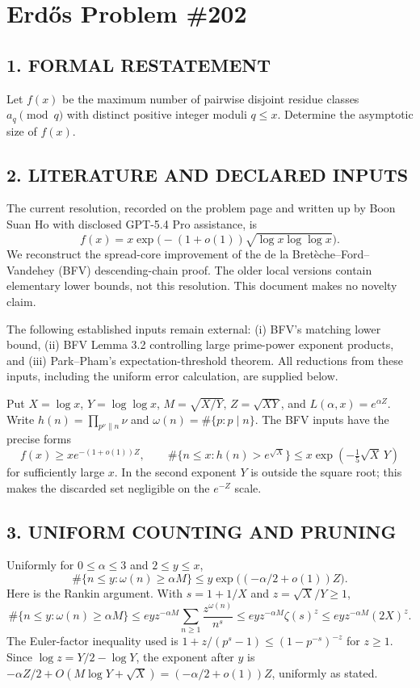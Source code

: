 \section{Erd\H{o}s Problem \#202}
\subsection*{1. FORMAL RESTATEMENT}
Let $f(x)$ be the maximum number of pairwise disjoint residue classes $a_q\pmod q$ with distinct positive integer moduli $q\le x$. Determine the asymptotic size of $f(x)$.
\subsection*{2. LITERATURE AND DECLARED INPUTS}
The current resolution, recorded on the problem page and written up by Boon Suan Ho with disclosed GPT-5.4 Pro assistance, is
\[
 f(x)=x\exp\bigl(-(1+o(1))\sqrt{\log x\log\log x}\bigr).
\]
We reconstruct the spread-core improvement of the de la Bret\`eche--Ford--Vandehey (BFV) descending-chain proof. The older local versions contain elementary lower bounds, not this resolution. This document makes no novelty claim.

The following established inputs remain external: (i) BFV's matching lower bound, (ii) BFV Lemma 3.2 controlling large prime-power exponent products, and (iii) Park--Pham's expectation-threshold theorem. All reductions from these inputs, including the uniform error calculation, are supplied below.

Put $X=\log x$, $Y=\log\log x$, $M=\sqrt{X/Y}$, $Z=\sqrt{XY}$, and $L(\alpha,x)=e^{\alpha Z}$. Write $h(n)=\prod_{p^\nu\parallel n}\nu$ and $\omega(n)=\#\{p:p\mid n\}$. The BFV inputs have the precise forms
\[
 f(x)\ge x e^{-(1+o(1))Z},\qquad
 \#\{n\le x:h(n)>e^{\sqrt X}\}\le x\exp(-\tfrac15\sqrt X\,Y)
                                                                  \tag{1}
\]
for sufficiently large $x$. In the second exponent $Y$ is outside the square root; this makes the discarded set negligible on the $e^{-Z}$ scale.
\subsection*{3. UNIFORM COUNTING AND PRUNING}
Uniformly for $0\le\alpha\le3$ and $2\le y\le x$,
\[
 \#\{n\le y:\omega(n)\ge\alpha M\}
 \le y\exp\bigl((-\alpha/2+o(1))Z\bigr).               \tag{2}
\]
Here is the Rankin argument. With $s=1+1/X$ and $z=\sqrt X/Y\ge1$,
\[
 \#\{n\le y:\omega(n)\ge\alpha M\}
 \le ey z^{-\alpha M}\sum_{n\ge1}\frac{z^{\omega(n)}}{n^s}
 \le ey z^{-\alpha M}\zeta(s)^z
 \le ey z^{-\alpha M}(2X)^z.
\]
The Euler-factor inequality used is $1+z/(p^s-1)\le(1-p^{-s})^{-z}$ for $z\ge1$. Since $\log z=Y/2-\log Y$, the exponent after $y$ is $-\alpha Z/2+O(M\log Y+\sqrt X)=(-\alpha/2+o(1))Z$, uniformly as stated.

